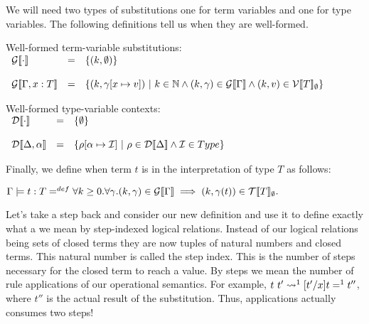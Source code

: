 \noindent
We will need two types of substitutions one for term variables and one for type variables.
The following definitions tell us when they are well-formed.
\begin{definition}
  \label{def:well-formed_term_var_subs}
  Well-formed term-variable substitutions:\\
  \begin{math}
    \begin{array}{lllll}
      \ginterp{\cdot} & = & \{ (k,\emptyset) \}\\
      & \\
      \ginterp{\Gamma,x:T} & = & 
      \{ (k, \gamma[x \mapsto v])\ |\ k \in \nat \land (k, \gamma) \in \ginterp{\Gamma} \land 
      (k,v) \in \vinterp{T}_\emptyset \}
    \end{array}
  \end{math}
\end{definition}

\begin{definition}
  \label{def:well-formed_type_var_subs}
  Well-formed type-variable contexts:\\
  \begin{math}
    \begin{array}{lll}
      \dinterp{\cdot} & = & \{ \emptyset \}\\
      & \\
      \dinterp{\Delta,\alpha} & = & \{ \rho[\alpha \mapsto \interpset]\ |\ 
      \rho \in \dinterp{\Delta} \land \interpset \in Type \}\\
    \end{array}
  \end{math}
\end{definition}
\noindent
Finally, we define when term $t$ is in the interpretation of type $T$ as follows:
\begin{center}
  \begin{math}
    \Gamma \models t : T =^{def} \forall k \geq 0 . \forall \gamma.(k, \gamma) \in 
    \mathcal{G}[\negthinspace[\Gamma]\negthinspace] \implies (k, \gamma(t)) \in \mathcal{T}[\negthinspace[T]\negthinspace]_\emptyset.
  \end{math}
\end{center}

Let's take a step back and consider our new definition and use it to
define exactly what a we mean by step-indexed logical relations.
Instead of our logical relations being sets of closed terms they are
now tuples of natural numbers and closed terms.  This natural number
is called the step index.  This is the number of steps necessary for
the closed term to reach a value.  By steps we mean the number of rule
applications of our operational semantics.  
For example, $t\ t'
\rightsquigarrow^1 [t'/x]t =^1 t''$, where $t''$ is the actual result of the
substitution.  Thus, applications actually consumes two steps!

